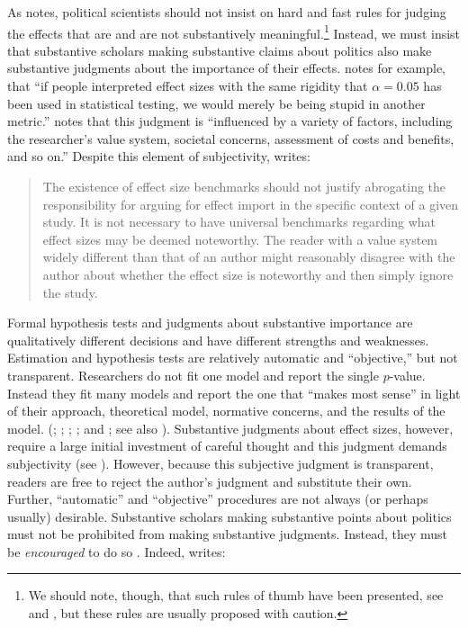 \documentclass[12pt]{article}
\begin{document}
As \cite{Rainey2014} notes, political scientists should not insist on hard and fast rules for judging the effects that are and are not substantively meaningful.\footnote{We should note, though, that such rules of thumb have been presented, see \cite{Glass1976} and \cite{Cohen1992}, but these rules are usually proposed with caution.} Instead, we must insist that substantive scholars making substantive claims about politics also make substantive judgments about the importance of their effects. \citet[pp. 82-83]{Thompson2001} notes for example, that ``if people interpreted effect sizes with the same rigidity that $\alpha = 0.05$ has been used in statistical testing, we would merely be being stupid in another metric.'' \cite{Kirk1996} notes that this judgment is ``influenced by a variety of factors, including the researcher's value system, societal concerns, assessment of costs and benefits, and so on.'' Despite this element of subjectivity, \citet[p. 30]{Thompson2002} writes: 

\begin{quote}
The existence of effect size benchmarks should not justify abrogating the responsibility for arguing for effect import in the specific context of a given study. It is not necessary to have universal benchmarks regarding what effect sizes may be deemed noteworthy. The reader with a value system widely different than that of an author might reasonably disagree with the author about whether the effect size is noteworthy and then simply ignore the study.
\end{quote}

Formal hypothesis tests and judgments about substantive importance are qualitatively different decisions and have different strengths and weaknesses. Estimation and hypothesis tests are relatively automatic and ``objective,'' but not transparent. Researchers do not fit one model and report the single $p$-value. Instead they fit many models and report the one that ``makes most sense'' in light of their approach, theoretical model, normative concerns, and the results of the model. (\citealt{GerberMalhotra2008}; \citealt{SimmonsNelsonSimonsohn2011}; \citealt{Francis2013}; \citealt{SimmonsNelsonSimonsohn2014}; and \citealt{EsareyWu2014}; see also \citealt{GelmanLoken2014}). Substantive judgments about effect sizes, however, require a large initial investment of careful thought and this judgment demands subjectivity (see \citealt{Rainey2014}). However, because this subjective judgment is transparent, readers are free to reject the author's judgment and substitute their own. Further, ``automatic'' and ``objective'' procedures are not always (or perhaps usually) desirable. Substantive scholars making substantive points about politics must not be prohibited from making substantive judgments. Instead, they must be \emph{encouraged} to do so \citep{Achen1982}. Indeed, \citet[p. 755]{Kirk1996} writes:
\end{document}
